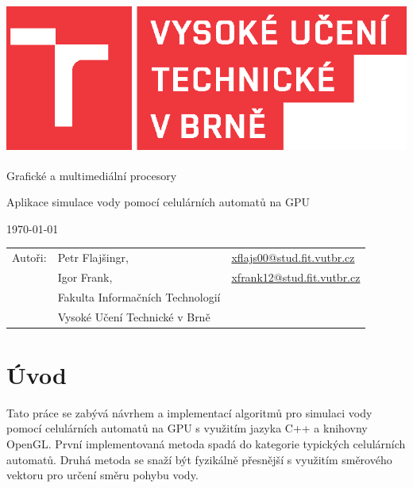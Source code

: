 \documentclass[12pt,a4paper,titlepage,final]{report}
\makeatletter
\newcommand\Course{Grafické a multimediální procesory}
\newcommand\WorkTitle{Aplikace simulace vody pomocí celulárních automatů na GPU}
\newcommand\AuthorA{Petr Flajšingr}
\newcommand\AuthorAEmail{xflajs00@stud.fit.vutbr.cz}
\newcommand\AuthorB{Igor Frank}
\newcommand\AuthorBEmail{xfrank12@stud.fit.vutbr.cz}
\newcommand\Faculty{Fakulta Informačních Technologií}
\newcommand\School{Vysoké Učení Technické v Brně}
\makeatother
\begin{document}
	\begin{titlepage}
	\begin{center}
		\includegraphics[height=5cm]{images/logo.eps}
	\end{center}
	\vfill
	\begin{center}
		\begin{Large}
			\Course\\
		\end{Large}
		\bigskip
		\begin{Huge}
			\WorkTitle\\
		\end{Huge}
	\end{center}
	\vfill
	\begin{center}
		\begin{large}
			\today
		\end{large}
	\end{center}
	\vfill
	\begin{flushleft}
		\begin{large}
			\begin{tabular}{lll}
				Autoři: & \AuthorA, & \url{\AuthorAEmail} \\
				& \AuthorB, & \url{\AuthorBEmail} \\
				& \Faculty \\
				& \School \\
			\end{tabular}
		\end{large}
	\end{flushleft}
\end{titlepage}		

\section{Úvod}
Tato práce se zabývá návrhem a implementací algoritmů pro simulaci vody pomocí celulárních automatů na GPU s využitím jazyka C++ a knihovny OpenGL. První implementovaná metoda spadá do kategorie typických celulárních automatů. Druhá metoda se snaží být fyzikálně přesnější s využitím směrového vektoru pro určení směru pohybu vody.
\end{document}
